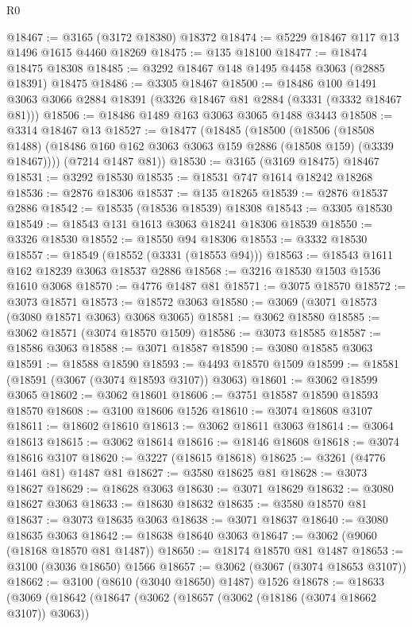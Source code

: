 \begin{lexlean}{R0}
\begin{coremodule}
@18467 := @3165 (@3172 @18380) @18372
@18474 := @5229 @18467 @117 @13 @1496 @1615 @4460 @18269
@18475 := @135 @18100
@18477 := @18474 @18475 @18308
@18485 := @3292 @18467 @148 @1495 @4458 @3063 (@2885 @18391) @18475
@18486 := @3305 @18467
@18500 := @18486
    @100
    @1491
    @3063
    @3066
    @2884
    @18391
    (@3326 @18467 @81 @2884 (@3331 (@3332 @18467 @81)))
@18506 := @18486 @1489 @163 @3063 @3065 @1488 @3443
@18508 := @3314 @18467 @13
@18527 := @18477
    (@18485
      (@18500
        (@18506
          (@18508 @1488)
          (@18486 @160 @162 @3063 @3063 @159 @2886 (@18508 @159) (@3339 @18467))))
      (@7214 @1487 @81))
@18530 := @3165 (@3169 @18475) @18467
@18531 := @3292 @18530
@18535 := @18531 @747 @1614 @18242 @18268
@18536 := @2876 @18306
@18537 := @135 @18265
@18539 := @2876 @18537 @2886
@18542 := @18535 (@18536 @18539) @18308
@18543 := @3305 @18530
@18549 := @18543 @131 @1613 @3063 @18241 @18306 @18539
@18550 := @3326 @18530
@18552 := @18550 @94 @18306
@18553 := @3332 @18530
@18557 := @18549 (@18552 (@3331 (@18553 @94)))
@18563 := @18543 @1611 @162 @18239 @3063 @18537 @2886
@18568 := @3216 @18530 @1503 @1536 @1610 @3068
@18570 := @4776 @1487 @81
@18571 := @3075 @18570
@18572 := @3073 @18571
@18573 := @18572 @3063
@18580 := @3069 (@3071 @18573 (@3080 @18571 @3063) @3068 @3065)
@18581 := @3062 @18580
@18585 := @3062 @18571 (@3074 @18570 @1509)
@18586 := @3073 @18585
@18587 := @18586 @3063
@18588 := @3071 @18587
@18590 := @3080 @18585 @3063
@18591 := @18588 @18590
@18593 := @4493 @18570 @1509
@18599 := @18581 (@18591 (@3067 (@3074 @18593 @3107)) @3063)
@18601 := @3062 @18599 @3065
@18602 := @3062 @18601
@18606 := @3751 @18587 @18590 @18593 @18570
@18608 := @3100 @18606 @1526
@18610 := @3074 @18608 @3107
@18611 := @18602 @18610
@18613 := @3062 @18611 @3063
@18614 := @3064 @18613
@18615 := @3062 @18614
@18616 := @18146 @18608
@18618 := @3074 @18616 @3107
@18620 := @3227 (@18615 @18618)
@18625 := @3261 (@4776 @1461 @81) @1487 @81
@18627 := @3580 @18625 @81
@18628 := @3073 @18627
@18629 := @18628 @3063
@18630 := @3071 @18629
@18632 := @3080 @18627 @3063
@18633 := @18630 @18632
@18635 := @3580 @18570 @81
@18637 := @3073 @18635 @3063
@18638 := @3071 @18637
@18640 := @3080 @18635 @3063
@18642 := @18638 @18640 @3063
@18647 := @3062 (@9060 (@18168 @18570 @81 @1487))
@18650 := @18174 @18570 @81 @1487
@18653 := @3100 (@3036 @18650) @1566
@18657 := @3062 (@3067 (@3074 @18653 @3107))
@18662 := @3100 (@8610 (@3040 @18650) @1487) @1526
@18678 := @18633
    (@3069
      (@18642
        (@18647
          (@3062
            (@18657 (@3062 (@18186 (@3074 @18662 @3107)) @3063))

\end{coremodule}
\end{lexlean}
